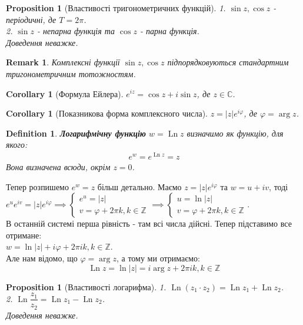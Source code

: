 \documentclass[a4paper, 10pt]{article}
\theoremstyle{theoremdd}
\theoremstyle{theoremdd}
\newtheorem{definition}[theorem]{Definition}
\theoremstyle{theoremdd}
\theoremstyle{theoremdd}
\theoremstyle{theoremdd}
\newtheorem{proposition}[theorem]{Proposition}
\theoremstyle{theoremdd}
\newtheorem{remark}[theorem]{Remark}
\theoremstyle{theoremdd}
\theoremstyle{theoremdd}
\newtheorem{corollary}[theorem]{Corollary}
\DeclareMathOperator{\Ln}{Ln}
\begin{document}
\begin{proposition}[Властивості тригонометричних функцій]
1. $\sin z, \cos z$ - періодичні, де $T = 2\pi$.\\
2. $\sin z$ - непарна функція та $\cos z$ - парна функція.\\
\textit{Доведення неважке.}
\end{proposition}

\begin{remark}
Комплексні функції $\sin z, \cos z$ підпорядковуються стандартним тригонометричним тотожностям.
\end{remark}

\begin{corollary}[Формула Ейлера]
$e^{iz} = \cos z + i \sin z$, де $z \in \mathbb{C}$.
\end{corollary}

\begin{corollary}[Показникова форма комплексного числа]
$z = |z| e^{i \varphi}$, де $\varphi = \arg z$.
\end{corollary}

\begin{definition}
\textbf{Логарифмічну функцію} $w = \Ln z$ визначимо як функцію, для якого:
\begin{align*}
e^w = e^{\Ln z} = z
\end{align*}
Вона визначена всюди, окрім $z = 0$.
\end{definition}

Тепер розпишемо $e^w = z$ більш детально. Маємо $z = |z| e^{i\varphi}$ та $w = u+iv$, тоді\\
$e^{u} e^{iv} = |z| e^{i\varphi} \implies \begin{cases} e^u = |z| \\ v = \varphi + 2\pi k, k \in \mathbb{Z} \end{cases} \implies \begin{cases} u = \ln |z| \\ v = \varphi + 2\pi k, k \in \mathbb{Z} \end{cases}$.\\
В останній системі перша рівність - там всі числа дійсні. Тепер підставимо все отримане:\\
$w = \ln |z| + i\varphi + 2\pi i k, k \in \mathbb{Z}$.\\
Але нам відомо, що $\varphi = \arg z$, а тому ми отримаємо:
$$ \Ln z = \ln |z| = i \arg z + 2\pi i k , k \in \mathbb{Z}$$

\begin{proposition}[Властивості логарифма]
1. $\Ln (z_1 \cdot z_2) = \Ln z_1 + \Ln z_2$.\\
2. $\Ln \dfrac{z_1}{z_2} = \Ln z_1 - \Ln z_2$.\\
\textit{Доведення неважке.}
\end{proposition}
\end{document}
